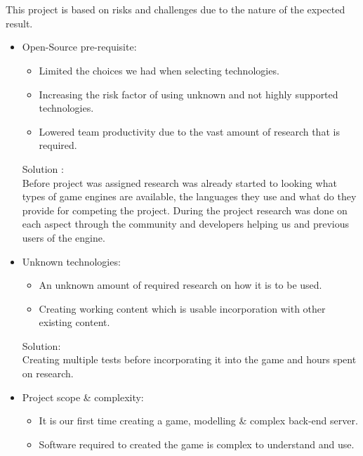 \documentclass[letterpaper]{article}
\begin{document}
		\newpage
		\vspace{0.2in}
	\section*{\colorbox{black}{}} 
		\vspace{0.1in}
		
		This project is based on risks and challenges due to the nature of the expected result.
		
		\begin{itemize}
			\item Open-Source pre-requisite:
				\begin{itemize}
					\item Limited the choices we had when selecting technologies.
					\item Increasing the risk factor of using unknown and not highly supported technologies.
					\item Lowered team productivity due to the vast amount of research that is required.
				\end{itemize}
				Solution : \\
				Before project was assigned research was already started to looking what types of game engines are available, the languages they use and what do they provide for competing the project. During the project research was done on each aspect through the community and developers helping us and previous users of the engine.
			\item Unknown technologies:
				\begin{itemize}
					\item An unknown amount of required research on how it is to be used.
					\item Creating working content which is usable incorporation with other existing content.
				\end{itemize}
				Solution: \\
				Creating multiple tests before incorporating it into the game and hours spent on research.
			\item Project scope \& complexity:
				\begin{itemize}
					\item It is our first time creating a game, modelling \& complex back-end server.
					\item Software required to created the game is complex to understand and use.

\end{itemize}
\end{itemize}
\end{document}
